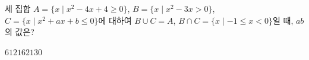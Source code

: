 세 집합 $A=\{x \mid x^2-4x+4\ge 0\}$, $B=\{x \mid x^2-3x>0\}$, $C=\{x \mid x^2+ax+b\le 0\}$에 대하여 $B\cup C=A$, $B\cap C=\{x \mid -1\le x<0\}$일 때, $ab$의 값은? 
\begin{choices32}{$6$}{$12$}{$16$}{$21$}{$30$}\end{choices32}
